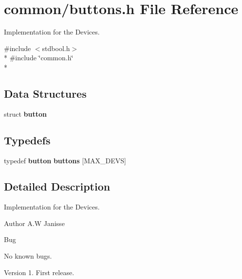\section{common/buttons.h File Reference}
\label{buttons_8h}


Implementation for the Devices.  


{\ttfamily \#include $<$stdbool.\-h$>$}\\*
{\ttfamily \#include \char`\"{}common.\-h\char`\"{}}\\*
\subsection*{Data Structures}
\begin{DoxyCompactItemize}
\item 
struct {\bf button}
\end{DoxyCompactItemize}
\subsection*{Typedefs}
\begin{DoxyCompactItemize}
\item 
typedef {\bf button} {\bf buttons} [M\-A\-X\-\_\-\-D\-E\-V\-S]
\end{DoxyCompactItemize}


\subsection{Detailed Description}
Implementation for the Devices. \begin{DoxyAuthor}{Author}
A.\-W Janisse 
\end{DoxyAuthor}
\begin{DoxyRefDesc}{Bug}
\item[{\bf Bug}]No known bugs.\end{DoxyRefDesc}


\begin{DoxyVersion}{Version}
1. First release. 
\end{DoxyVersion}
